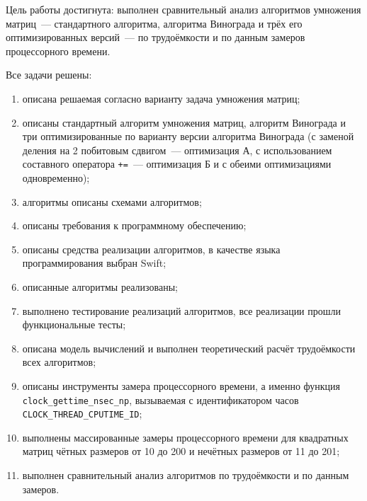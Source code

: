 
Цель работы достигнута: выполнен сравнительный анализ алгоритмов умножения матриц~--- стандартного алгоритма, алгоритма Винограда и трёх его оптимизированных версий~--- по трудоёмкости и по данным замеров процессорного времени.

Все задачи решены:
\begin{enumerate}
	\item описана решаемая согласно варианту задача умножения матриц;
	\item описаны стандартный алгоритм умножения матриц, алгоритм Винограда и три оптимизированные по варианту версии алгоритма Винограда (с заменой деления на 2 побитовым сдвигом~--- оптимизация А, с использованием составного оператора \texttt{+=}~--- оптимизация Б и с обеими оптимизациями одновременно);
	\item алгоритмы описаны схемами алгоритмов;
	\item описаны требования к программному обеспечению;
	\item описаны средства реализации алгоритмов, в качестве языка программирования выбран Swift;
	\item описанные алгоритмы реализованы;
	\item выполнено тестирование реализаций алгоритмов, все реализации прошли функциональные тесты;
	\item описана модель вычислений и выполнен теоретический расчёт трудоёмкости всех алгоритмов;
	\item описаны инструменты замера процессорного времени, а именно функция \texttt{clock\_gettime\_nsec\_np}, вызываемая с идентификатором часов \texttt{CLOCK\_THREAD\_CPUTIME\_ID};
	\item выполнены массированные замеры процессорного времени для квадратных матриц чётных размеров от 10 до 200 и нечётных размеров от 11 до 201;
	\item выполнен сравнительный анализ алгоритмов по трудоёмкости и по данным замеров.
\end{enumerate}

